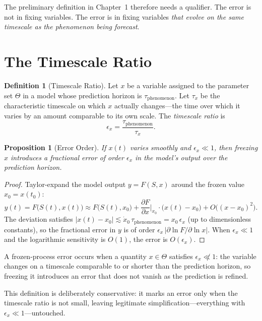 \documentclass[11pt]{book}
\theoremstyle{plain}
\newtheorem{proposition}[theorem]{Proposition}
\theoremstyle{definition}
\newtheorem{definition}[theorem]{Definition}
\theoremstyle{remark}
\begin{document}
The preliminary definition in Chapter~1 therefore needs a qualifier. The error is not in fixing variables. The error is in fixing variables \emph{that evolve on the same timescale as the phenomenon being forecast}.

\section{The Timescale Ratio}

\begin{definition}[Timescale Ratio]
\label{def:epsilon}
Let $x$ be a variable assigned to the parameter set $\Theta$ in a model whose prediction horizon is $\tau_{\mathrm{phenomenon}}$. Let $\tau_{x}$ be the characteristic timescale on which $x$ actually changes---the time over which it varies by an amount comparable to its own scale. The \emph{timescale ratio} is
\[
\epsilon_x = \frac{\tau_{\mathrm{phenomenon}}}{\tau_{x}}.
\]
\end{definition}

\begin{proposition}[Error Order]
\label{prop:error-order}
If $x(t)$ varies smoothly and $\epsilon_x \ll 1$, then freezing $x$ introduces a fractional error of order $\epsilon_x$ in the model's output over the prediction horizon.
\end{proposition}
\begin{proof}
Taylor-expand the model output $y = F(S, x)$ around the frozen value $x_0 = x(t_0)$:
\[
y(t) = F\!\big(S(t), x(t)\big) \approx F\!\big(S(t), x_0\big) + \frac{\partial F}{\partial x}\bigg|_{x_0}\!\cdot \big(x(t)-x_0\big) + O\!\big((x-x_0)^2\big).
\]
The deviation satisfies $|x(t)-x_0| \lesssim \dot x_0\,\tau_{\mathrm{phenomenon}} = x_0\,\epsilon_x$ (up to dimensionless constants), so the fractional error in $y$ is of order $\epsilon_x\,|\partial \ln F/\partial \ln x|$. When $\epsilon_x \ll 1$ and the logarithmic sensitivity is $O(1)$, the error is $O(\epsilon_x)$.
\end{proof}

\begin{tcolorbox}[title={Frozen Process Error, Defined}]
A frozen-process error occurs when a quantity $x \in \Theta$ satisfies $\epsilon_x \not\ll 1$: the variable changes on a timescale comparable to or shorter than the prediction horizon, so freezing it introduces an error that does not vanish as the prediction is refined.
\end{tcolorbox}

This definition is deliberately conservative: it marks an error only when the timescale ratio is not small, leaving legitimate simplification---everything with $\epsilon_x \ll 1$---untouched.
\end{document}
